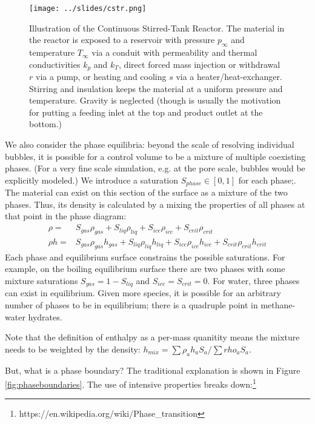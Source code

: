 \documentclass[AMA,STIX1COL]{WileyNJD-v2}
\begin{document}
\begin{figure}
  \centering
  \texttt{[image: ../slides/cstr.png]}
  \caption{ \label{fig:cstr} Illustration of the Continuous
    Stirred-Tank    
  Reactor. The material in the reactor is exposed to a reservoir with
  pressure
  $p_\infty$ and temperature $T_\infty$ via a conduit with permeability
  and thermal conductivities $k_p$ and $k_T$, direct forced mass
  injection or withdrawal $r$ via a pump, or heating and cooling $s$
  via a heater/heat-exchanger. Stirring and insulation keeps the
  material at a uniform pressure and temperature. Gravity is
  neglected (though is usually the motivation for putting a feeding inlet at
the top and product outlet at the bottom.)}
\end{figure}

We also consider the phase equilibria: beyond the scale of resolving
individual bubbles, it is possible
for a control volume to be a mixture of multiple coexisting
phases.
(For a very fine scale simulation, e.g. at the pore scale, bubbles
would be explicitly modeled.)
We introduce a saturation $S_{phase}\in[0,1]$ for each phase;.
The material can exist on this section of the surface as a mixture of
the two phases. Thus, its density is calculated by a mixing the
properties of all phases at that point in the phase diagram:
\begin{align}
  \rho = & S_{gas} \rho_{gas} + S_{liq} \rho_{liq} + S_{ice}
  \rho_{ice} + S_{crit} \rho_{crit} \\
  \rho h =& S_{gas} \rho_{gas} h_{gas} + S_{liq} \rho_{liq} h_{liq} + S_{ice}
  \rho_{ice} h_{ice} + S_{crit} \rho_{crit} h_{crit}
\end{align}
Each phase
and equilibrium surface constrains the possible saturations. For example, on the boiling equilibrium surface there are two phases with some mixture
saturations \(S_{gas}=1-S_{liq}\) and $S_{ice}=S_{crit}=0$. 
For water, three phases can exist in equilibrium. Given more species, it is possible for an arbitrary number of phases
to be in equilibrium; there is a quadruple point in methane-water
hydrates.

Note that the definition of enthalpy as a per-mass quanitity means the mixture needs to be weighted by the
density: $h_{mix}=\sum{\rho_a h_aS_a}/\sum{rho_aS_a}$.

But, what is a phase boundary? The traditional explanation is shown in
Figure \ref{fig:phaseboundaries}. The use of intensive properties breaks down:\footnote{https://en.wikipedia.org/wiki/Phase\_transition}
\end{document}
